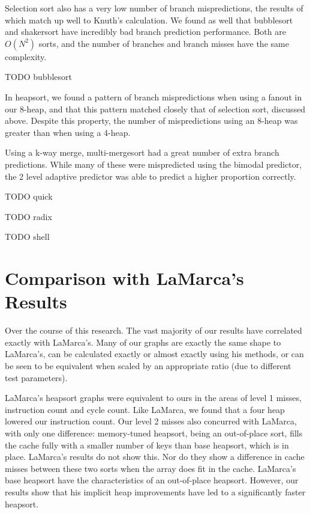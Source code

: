 Selection sort also has a very low number of branch mispredictions, the results
of which match up well to Knuth's calculation. We found as well that bubblesort
and shakersort have incredibly bad branch prediction performance. Both are
$O(N^2)$ sorts, and the number of branches and branch misses have the same
complexity.

TODO bubblesort

In heapsort, we found a pattern of branch mispredictions when using a fanout in
our 8-heap, and that this pattern matched closely that of selection sort,
discussed above. Despite this property, the number of mispredictions using an
8-heap was greater than when using a 4-heap.

Using a k-way merge, multi-mergesort had a great number of extra branch
predictions. While many of these were mispredicted using the bimodal predictor,
the 2 level adaptive predictor was able to predict a higher
proportion correctly.


TODO quick

TODO radix

TODO shell



\section{Comparison with LaMarca's Results}

Over the course of this research. The vast majority of our results have
correlated exactly with LaMarca's. Many of our graphs are exactly the same
shape to LaMarca's, can be calculated exactly or almost exactly using his
methods, or can be seen to be equivalent when scaled by an appropriate ratio
(due to different test parameters).

LaMarca's heapsort graphs were equivalent to ours in the areas of level 1
misses, instruction count and cycle count. Like LaMarca, we found that a four
heap lowered our instruction count. Our level 2 misses also concurred with
LaMarca, with only one difference: memory-tuned heapsort, being an out-of-place sort,
fills the cache fully with a smaller number of keys than base heapsort, which is
in place. LaMarca's results do not show this. Nor do they show a difference in
cache misses between these two sorts when the array does fit in the cache.
LaMarca's base heapsort have the characteristics of an out-of-place heapsort.
However, our results show that his implicit heap improvements have led to a
significantly faster heapsort.

